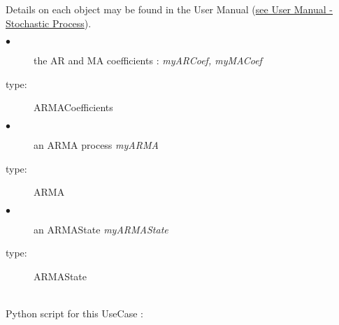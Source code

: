 Details on each object may be found in the User Manual  (\href{OpenTURNS_UserManual_TUI.pdf}{see User Manual - Stochastic Process}).\\



{
  \begin{description}
  \item[$\bullet$] the AR and MA coefficients : {\itshape myARCoef, myMACoef}
  \item[type:]  ARMACoefficients
  \end{description}

  \begin{description}
  \item[$\bullet$] an ARMA process {\itshape myARMA}
  \item[type:]  ARMA
  \end{description}

  \begin{description}
  \item[$\bullet$] an ARMAState {\itshape myARMAState}
  \item[type:]  ARMAState
  \end{description}
}

\textspace\\
Python script for this UseCase :


